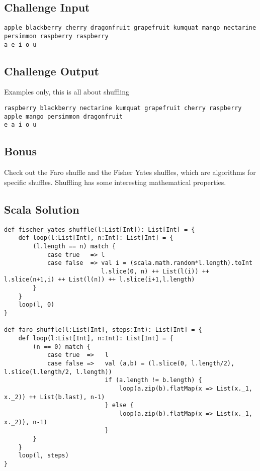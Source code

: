 \subsection{Challenge Input}\label{challenge-input-6}

\begin{verbatim}
apple blackberry cherry dragonfruit grapefruit kumquat mango nectarine persimmon raspberry raspberry
a e i o u
\end{verbatim}

\subsection{Challenge Output}\label{challenge-output-5}

Examples only, this is all about shuffling

\begin{verbatim}
raspberry blackberry nectarine kumquat grapefruit cherry raspberry apple mango persimmon dragonfruit
e a i o u
\end{verbatim}

\subsection{Bonus}\label{bonus}

Check out the Faro shuffle and the Fisher Yates shuffles, which are
algorithms for specific shuffles. Shuffling has some interesting
mathematical properties.

\subsection{Scala Solution}\label{scala-solution-7}

\begin{verbatim}
def fischer_yates_shuffle(l:List[Int]): List[Int] = {   
    def loop(l:List[Int], n:Int): List[Int] = {
        (l.length == n) match {
            case true   => l
            case false  => val i = (scala.math.random*l.length).toInt
                           l.slice(0, n) ++ List(l(i)) ++ l.slice(n+1,i) ++ List(l(n)) ++ l.slice(i+1,l.length)
        }
    }
    loop(l, 0)
}

def faro_shuffle(l:List[Int], steps:Int): List[Int] = {
    def loop(l:List[Int], n:Int): List[Int] = {
        (n == 0) match {
            case true  =>   l
            case false =>   val (a,b) = (l.slice(0, l.length/2), l.slice(l.length/2, l.length))
                            if (a.length != b.length) {
                                loop(a.zip(b).flatMap(x => List(x._1, x._2)) ++ List(b.last), n-1)
                            } else {
                                loop(a.zip(b).flatMap(x => List(x._1, x._2)), n-1)
                            }
        }
    }
    loop(l, steps)
}
\end{verbatim}

